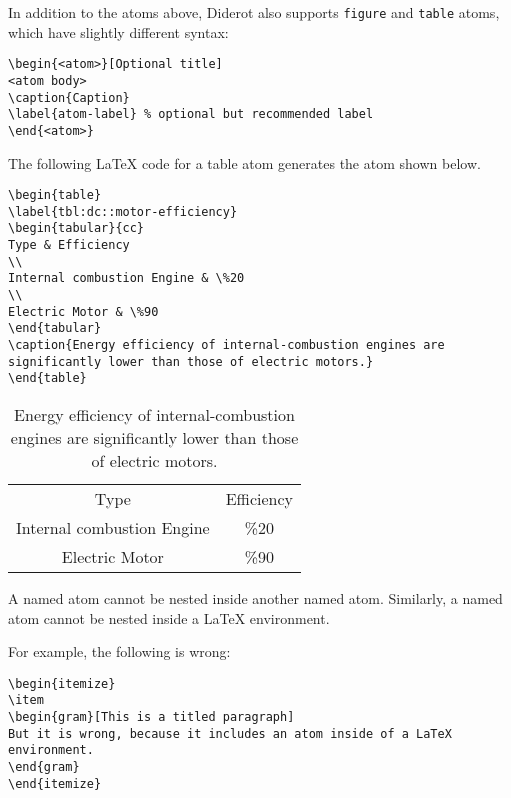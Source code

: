 \begin{flex}

\begin{important}
In addition to the atoms above, Diderot also supports \lstinline`figure` and \lstinline`table` atoms, which have slightly different syntax:
\begin{lstlisting}
\begin{<atom>}[Optional title]
<atom body>
\caption{Caption}
\label{atom-label} % optional but recommended label
\end{<atom>}
\end{lstlisting}
\end{important}


\begin{example}
The following LaTeX code for a table atom generates the atom shown below.

\begin{lstlisting}
\begin{table}
\label{tbl:dc::motor-efficiency}
\begin{tabular}{cc}
Type & Efficiency
\\
Internal combustion Engine & \%20
\\
Electric Motor & \%90
\end{tabular}
\caption{Energy efficiency of internal-combustion engines are significantly lower than those of electric motors.}
\end{table}
\end{lstlisting}
\end{example}

\begin{table}
\label{tbl:dc::motor-efficiency}
\begin{tabular}{cc}
Type & Efficiency
\\
Internal combustion Engine & \%20
\\
Electric Motor & \%90
\end{tabular}
\caption{Energy efficiency of  internal-combustion engines are significantly lower than those of electric motors.}
\end{table}
\end{flex}

\begin{important}
A named atom cannot be nested inside another named atom.
%
Similarly, a named atom cannot be nested inside a LaTeX environment.

For example, the following is wrong:
\begin{lstlisting}
\begin{itemize}
\item 
\begin{gram}[This is a titled paragraph]
But it is wrong, because it includes an atom inside of a LaTeX environment.
\end{gram}
\end{itemize}
\end{lstlisting}
\end{important}

